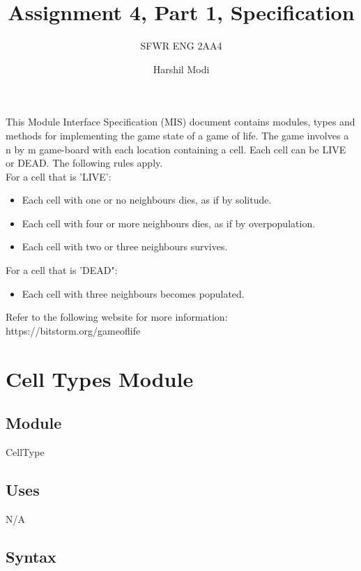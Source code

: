 \documentclass[12pt]{article}
\title{Assignment 4, Part 1, Specification}
\author{SFWR ENG 2AA4}
\author{Harshil Modi}
\begin{document}
\maketitle

\noindent This Module Interface Specification (MIS) document contains modules, types and methods for implementing the game state of a game of life. The game involves a n by m game-board with each location containing a cell. Each cell can be LIVE or DEAD. The following rules apply. \\

For a cell that is 'LIVE':
\begin{itemize}
\item Each cell with one or no neighbours dies, as if by solitude.
\item Each cell with four or more neighbours dies, as if by overpopulation.
\item Each cell with two or three neighbours survives.
\end{itemize}

For a cell that is 'DEAD":
\begin{itemize}
\item Each cell with three neighbours becomes populated.
\end{itemize}
Refer to the following website for more information: https://bitstorm.org/gameoflife


\maketitle

\newpage

\section* {Cell Types Module}

\subsection*{Module}
CellType

\subsection* {Uses}

N/A

\subsection* {Syntax}
\end{document}
